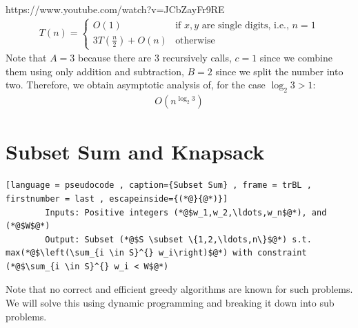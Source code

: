 \documentclass[a4paper]{article}
\theoremstyle{plain}
\theoremstyle{definition}
\theoremstyle{remark}
\begin{document}
		https://www.youtube.com/watch?v=JCbZayFr9RE
		\begin{align*}
			T(n) = \begin{cases}
				O (1) & \text{if } x,y \text{ are single digits, i.e., } n=1 \\
				3T\left( \frac{n}{2} \right) + O(n) & \text{otherwise}
			\end{cases}
		\end{align*}
		Note that $A=3$ because there are $3$ recursively calls, $c = 1$ since we combine them using only addition and subtraction, $B=2$ since we split the number into two. Therefore, we obtain asymptotic analysis of, for the case $\log_2 3 > 1$:
		\begin{align*}
			O(n^{\log_2 3})
		\end{align*}
		\section{Subset Sum and Knapsack}
		\begin{lstlisting}[language = pseudocode , caption={Subset Sum} , frame = trBL , firstnumber = last , escapeinside={(*@}{@*)}]
		Inputs: Positive integers (*@$w_1,w_2,\ldots,w_n$@*), and (*@$W$@*)
		Output: Subset (*@$S \subset \{1,2,\ldots,n\}$@*) s.t. max(*@$\left(\sum_{i \in S}^{} w_i\right)$@*) with constraint (*@$\sum_{i \in S}^{} w_i < W$@*)
		\end{lstlisting}
		Note that no correct and efficient greedy algorithms are known for such problems. We will solve this using dynamic programming and breaking it down into sub problems.
\end{document}
